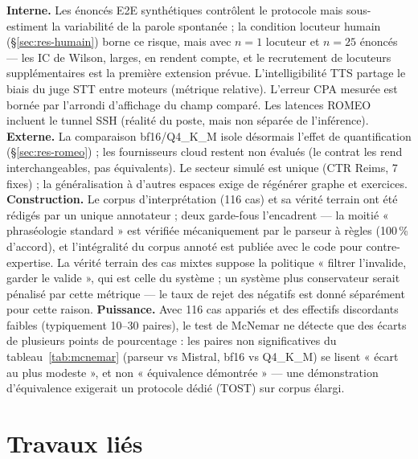\documentclass[10pt,a4paper]{article}
\begin{document}
\textbf{Interne.} Les énoncés E2E synthétiques contrôlent le protocole mais
sous-estiment la variabilité de la parole spontanée ; la condition locuteur
humain (\S\ref{sec:res-humain}) borne ce risque, mais avec $n=1$ locuteur
et $n=25$ énoncés --- les IC de Wilson, larges, en rendent compte, et le
recrutement de locuteurs supplémentaires est la première extension prévue.
L'intelligibilité TTS partage le biais du juge STT entre moteurs (métrique
relative). L'erreur CPA mesurée est bornée par l'arrondi d'affichage du
champ comparé. Les latences ROMEO incluent le tunnel SSH (réalité du poste,
mais non séparée de l'inférence). \textbf{Externe.} La comparaison
bf16/Q4\_K\_M isole désormais l'effet de quantification
(\S\ref{sec:res-romeo}) ; les fournisseurs cloud restent non évalués (le
contrat les rend interchangeables, pas équivalents). Le secteur simulé est
unique (CTR Reims, 7 fixes) ; la généralisation à d'autres espaces exige de
régénérer graphe et exercices. \textbf{Construction.} Le corpus
d'interprétation (116 cas) et sa vérité terrain ont été rédigés par un
unique annotateur ; deux garde-fous l'encadrent --- la moitié
« phraséologie standard » est vérifiée mécaniquement par le parseur à
règles (100\,\% d'accord), et l'intégralité du corpus annoté est publiée
avec le code pour contre-expertise. La vérité terrain des cas mixtes
suppose la politique « filtrer l'invalide, garder le valide », qui est
celle du système ; un système plus conservateur serait pénalisé par cette
métrique --- le taux de rejet des négatifs est donné séparément pour cette
raison. \textbf{Puissance.} Avec 116 cas appariés et des effectifs
discordants faibles (typiquement 10--30 paires), le test de McNemar ne
détecte que des écarts de plusieurs points de pourcentage : les paires non
significatives du tableau~\ref{tab:mcnemar} (parseur vs Mistral,
bf16 vs Q4\_K\_M) se lisent « écart au plus modeste », et non
« équivalence démontrée » --- une démonstration d'équivalence exigerait un
protocole dédié (TOST) sur corpus élargi.

\section{Travaux liés}
\end{document}
